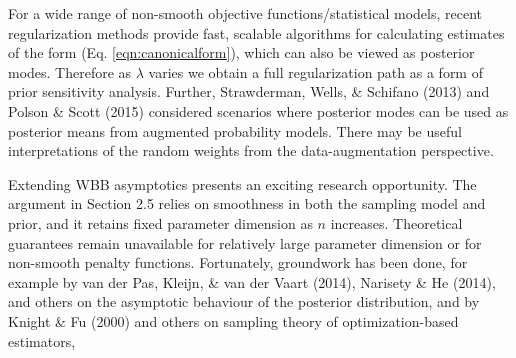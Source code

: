 \documentclass[12pt]{TD-CJS}
\begin{document}
For a wide range of non-smooth objective functions/statistical models, recent regularization methods provide fast, scalable algorithms for calculating estimates of the form (Eq. \ref{eqn:canonicalform}), which can also be viewed as posterior modes. Therefore as $\lambda$ varies we obtain a full regularization path as a form of prior sensitivity analysis. Further, Strawderman, Wells, \& Schifano  (2013) and Polson \& Scott (2015) 
considered scenarios where posterior modes can be used as posterior means from augmented probability models.
There may be useful interpretations of the random weights from the data-augmentation perspective.


Extending WBB asymptotics presents an exciting research opportunity.   
The argument in Section 2.5 
relies on smoothness in both the sampling model and prior, and it retains fixed parameter
dimension as $n$ increases.  Theoretical guarantees remain unavailable for relatively large parameter
dimension or for non-smooth penalty functions.  Fortunately, groundwork has been done, for example by 
van der Pas, Kleijn,   \& van der Vaart (2014), 
Narisety \& He  (2014), and others on the asymptotic  behaviour of the 
posterior distribution,  and by Knight \& Fu (2000) and others on sampling theory of 
optimization-based estimators,
\end{document}
